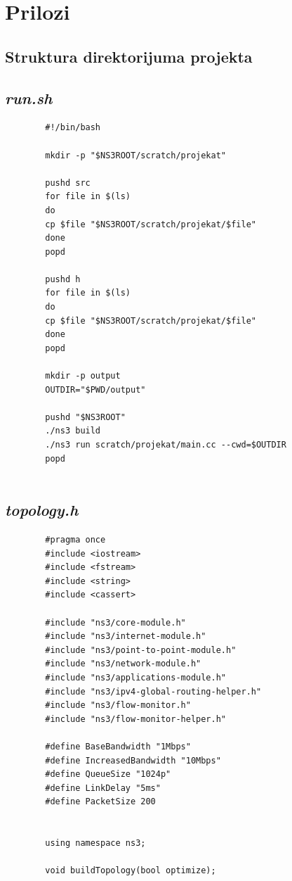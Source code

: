 \documentclass[a4paper, 12pt, projekat]{etf}
\begin{document}
	\chapter*{Prilozi} 
	\section*{Struktura direktorijuma projekta}
	\section*{\emph{run.sh}}
	\begin{verbatim}
		#!/bin/bash
		
		mkdir -p "$NS3ROOT/scratch/projekat"
		
		pushd src
		for file in $(ls)
		do
		cp $file "$NS3ROOT/scratch/projekat/$file"
		done
		popd
		
		pushd h
		for file in $(ls)
		do
		cp $file "$NS3ROOT/scratch/projekat/$file"
		done
		popd
		
		mkdir -p output
		OUTDIR="$PWD/output"
		
		pushd "$NS3ROOT"
		./ns3 build
		./ns3 run scratch/projekat/main.cc --cwd=$OUTDIR
		popd
		
	\end{verbatim}
	\section*{\emph{topology.h}}
	\begin{verbatim}
		#pragma once
		#include <iostream>
		#include <fstream>
		#include <string>
		#include <cassert>
		
		#include "ns3/core-module.h"
		#include "ns3/internet-module.h"
		#include "ns3/point-to-point-module.h"
		#include "ns3/network-module.h"
		#include "ns3/applications-module.h"
		#include "ns3/ipv4-global-routing-helper.h"
		#include "ns3/flow-monitor.h"
		#include "ns3/flow-monitor-helper.h"
		
		#define BaseBandwidth "1Mbps"
		#define IncreasedBandwidth "10Mbps"
		#define QueueSize "1024p"
		#define LinkDelay "5ms"
		#define PacketSize 200
		
		
		using namespace ns3;
		
		void buildTopology(bool optimize);
	\end{verbatim}
\end{document}
